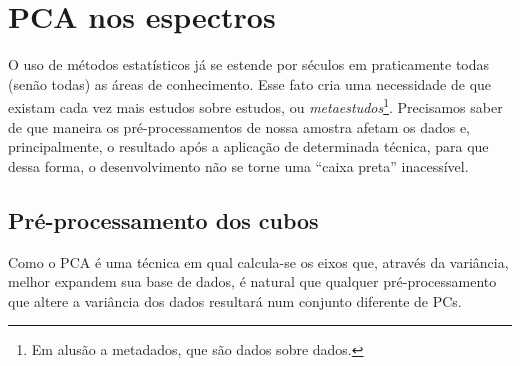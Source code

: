 



\chapter{PCA nos espectros}
\label{sec:UsoPCA}

O uso de métodos estatísticos já se estende por séculos em praticamente todas
(senão todas) as áreas de conhecimento. Esse fato cria uma necessidade de que
existam cada vez mais estudos sobre estudos, ou {\em metaestudos}\footnote{Em
alusão a metadados, que são dados sobre dados.}. Precisamos saber de que maneira
os pré-processamentos de nossa amostra afetam os dados e, principalmente, o
resultado após a aplicação de determinada técnica, para que dessa forma, o
desenvolvimento não se torne uma ``caixa preta'' inacessível.

\section{Pré-processamento dos cubos}
\label{sec:UsoPCA:PCAlidades}

Como o PCA é uma técnica em qual calcula-se os eixos que, através da variância,
melhor expandem sua base de dados, é natural que qualquer pré-processamento que
altere a variância dos dados resultará num conjunto diferente de PCs. 

